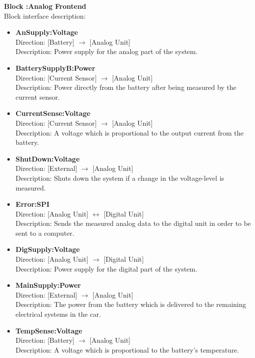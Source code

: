 \textbf{Block :Analog Frontend}\\
Block interface description:
\begin{itemize}
	\item \textbf{AnSupply:Voltage}\\
	Direction: [Battery] $\rightarrow$ [Analog Unit]\\
	Description: Power supply for the analog part of the system.
	\item \textbf{BatterySupplyB:Power}\\
	Direction: [Current Sensor] $\rightarrow$ [Analog Unit]\\
	Description: Power directly from the battery after being measured by the current sensor.
	\item \textbf{CurrentSense:Voltage}\\
	Direction: [Current Sensor] $\rightarrow$ [Analog Unit]\\
	Description: A voltage which is proportional to the output current from the battery.
	\item \textbf{ShutDown:Voltage}\\
	Direction: [External] $\rightarrow$ [Analog Unit]\\
	Description: Shuts down the system if a change in the voltage-level is measured.
	\item \textbf{Error:SPI}\\
	Direction: [Analog Unit] $\leftrightarrow$ [Digital Unit]\\
	Description: Sends the measured analog data to the digital unit in order to be sent to a computer.
	\item \textbf{DigSupply:Voltage}\\
	Direction: [Analog Unit] $\rightarrow$ [Digital Unit]\\
	Description: Power supply for the digital part of the system.
	\item \textbf{MainSupply:Power}\\
	Direction: [External] $\rightarrow$ [Analog Unit]\\
	Description: The power from the battery which is delivered to the remaining electrical systems in the car.
	\item \textbf{TempSense:Voltage}\\
	Direction: [Battery] $\rightarrow$ [Analog Unit]\\
	Description: A voltage which is proportional to the battery's temperature.
\end{itemize}

